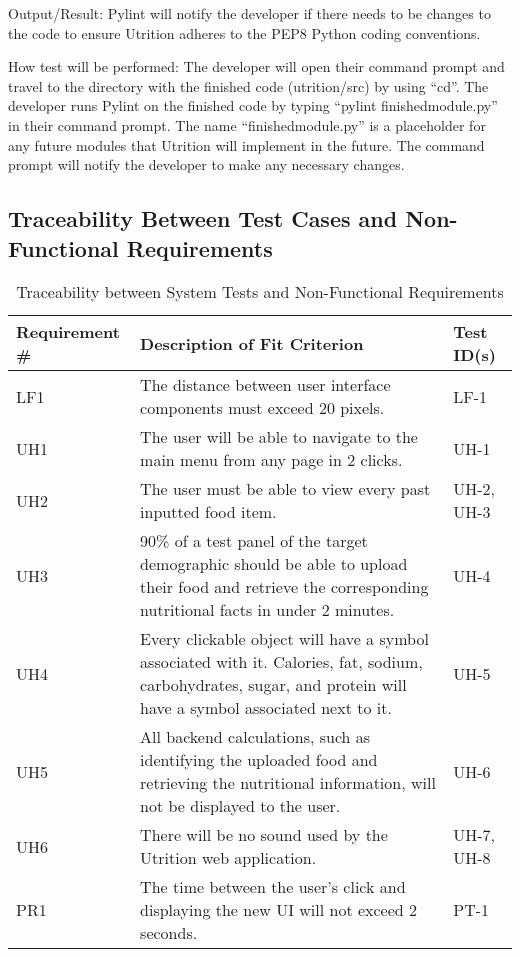 \documentclass[12pt, titlepage]{article}
\begin{document}
\begin{enumerate}
		Output/Result: Pylint will notify the developer if there needs to be changes to the code to ensure Utrition adheres to the PEP8 Python coding conventions.
		
		How test will be performed: The developer will open their command prompt and travel to the directory with the finished code (utrition/src) by using “cd”. The developer runs Pylint on the finished code by typing “pylint finishedmodule.py” in their command prompt. The name “finishedmodule.py” is a placeholder for any future modules that Utrition will implement in the future. The command prompt will notify the developer to make any necessary changes.
		
		
	\end{enumerate}
	
	\subsection{Traceability Between Test Cases and Non-Functional Requirements}
	
	
	\begin{table}[H]
		\caption{Traceability between System Tests and Non-Functional Requirements}
		\begin{tabularx}{\linewidth}{|l|X|l|}
			\hline
			{\bf Requirement \#} & {\bf Description of Fit Criterion} & {\bf Test ID(s)}\\
			\hline
			LF1 & The distance between user interface components must exceed 20 pixels. & LF-1 \\
			\hline
			UH1 & The user will be able to navigate to the main menu from any page in 2 clicks. & UH-1 \\
			\hline
			UH2 & The user must be able to view every past inputted food item. & UH-2, UH-3 \\
			\hline
			UH3 & 90\% of a test panel of the target demographic should be able to upload their food and retrieve the corresponding nutritional facts in under 2 minutes. & UH-4 \\
			\hline
			UH4 & Every clickable object will have a symbol associated with it. Calories, fat, sodium, carbohydrates, sugar, and protein will have a symbol associated next to it.
			& UH-5 \\
			\hline
			UH5 & All backend calculations, such as identifying the uploaded food and retrieving the nutritional information, will not be displayed to the user. & UH-6 \\
			\hline
			UH6 & There will be no sound used by the Utrition web application.  & UH-7, UH-8 \\
			\hline
			PR1 & The time between the user’s click and displaying the new UI will not exceed 2 seconds. & PT-1 \\
			\hline
		\end{tabularx}
		\label{tab:Non-Functional Traceability}
	\end{table}
	
\end{document}
